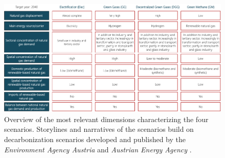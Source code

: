 \begin{figure}
	\includegraphics[width=1\linewidth]{figures/method/scenario_narrative.pdf}
	\caption{Overview of the most relevant dimensions characterizing the four scenarios. Storylines and narratives of the scenarios build on decarbonization scenarios developed and published by the \textit{Environment Agency Austria} \cite{umweltbundesamt} and \textit{Austrian Energy Agency} \cite{Energieagentur}.}
	\label{fig:scenario_narratives}
\end{figure} 
